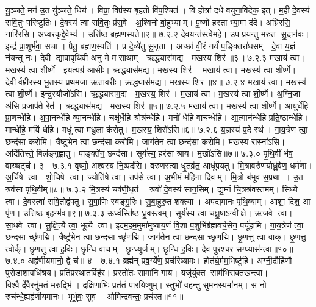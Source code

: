 यु॒ञ्जते॒ मन॑ उ॒त यु॑ञ्जते॒ धिय॑। विप्रा॒ विप्र॑स्य बृह॒तो वि॑प॒श्चित॑। वि होत्रा॑ दधे वयुना॒विदेक॒ इत्। म॒ही दे॒वस्य॑ सवि॒तुः परि॑ष्टुतिः। दे॒वस्य॑ त्वा सवि॒तुः प्र॑स॒वे। अ॒श्विनोर्बा॒हुभ्याम्। पू॒ष्णो हस्ताभ्या॒मा द॑दे। अभ्रि॑रसि॒ नारि॑रसि। अ॒ध्व॒र॒कृद्दे॒वेभ्य॑। उत्ति॑ष्ठ ब्रह्मणस्पते॥२॥
७.२.२
दे॒व॒यन्त॑स्त्वेमहे। उप॒ प्रय॑न्तु म॒रुत॑ सु॒दान॑वः। इन्द्र॑ प्रा॒शूर्भ॑वा॒ सचा। प्रैतु॒ ब्रह्म॑ण॒स्पति॑। प्र दे॒व्ये॑तु सू॒नृता। अच्छा॑ वी॒रं नर्यं॑ प॒ङ्क्तिरा॑धसम्। दे॒वा य॒ज्ञं न॑यन्तु नः। देवी द्यावापृथिवी॒ अनु॑ मे मसाथाम्। ऋ॒द्ध्यास॑म॒द्य। म॒खस्य॒ शिर॑॥३॥
७.२.३
म॒खाय॑ त्वा। म॒खस्य॑ त्वा शी॒र्ष्णे। इय॒त्यग्र॑ आसीः। ऋ॒द्ध्यास॑म॒द्य। म॒खस्य॒ शिर॑। म॒खाय॑ त्वा। म॒खस्य॑ त्वा शी॒र्ष्णे। देवीर्वम्रीर॒स्य भू॒तस्य॑ प्रथमजा ऋतावरीः। ऋ॒द्ध्यास॑म॒द्य। म॒खस्य॒ शिर॑॥४॥
७.२.४
म॒खाय॑ त्वा। म॒खस्य॑ त्वा शी॒र्ष्णे। इन्द्र॒स्यौजो॑ऽसि। ऋ॒द्ध्यास॑म॒द्य। म॒खस्य॒ शिर॑। म॒खाय॑ त्वा। म॒खस्य॑ त्वा शी॒र्ष्णे। अ॒ग्नि॒जा अ॑सि प्र॒जाप॑ते॒ रेत॑। ऋ॒द्ध्यास॑म॒द्य। म॒खस्य॒ शिर॑॥५॥
७.२.५
म॒खाय॑ त्वा। म॒खस्य॑ त्वा शी॒र्ष्णे। आयु॑र्धेहि प्रा॒णन्धे॑हि। अ॒पा॒नन्धे॑हि व्या॒नन्धे॑हि। चक्षु॑र्धेहि॒ श्रोत्र॑न्धेहि। मनो॑ धेहि॒ वाच॑न्धेहि। आ॒त्मान॑न्धेहि प्रति॒ष्ठान्धे॑हि। मान्धे॑हि॒ मयि॑ धेहि। मधु॑ त्वा मधु॒ला क॑रोतु। म॒खस्य॒ शिरो॑ऽसि॥६॥
७.२.६
य॒ज्ञस्य॑ प॒दे स्थ॑। गा॒य॒त्रेण॑ त्वा॒ छन्द॑सा करोमि। त्रैष्टु॑भेन त्वा॒ छन्द॑सा करोमि। जाग॑तेन त्वा॒ छन्द॑सा करोमि। म॒खस्य॒ रास्ना॑ऽसि। अदि॑तिस्ते॒ बिल॑ङ्गृह्णातु। पाङ्क्ते॑न॒ छन्द॑सा। सूर्य॑स्य॒ हर॑सा श्राय। म॒खो॑ऽसि॥७॥
७.३.०
पृ॒थि॒वीं भ॑व॒ वाख्षट्च॑। ३।
\anuvakamend
७.३.१
वृष्णो॒ अश्व॑स्य नि॒ष्पद॑सि। वरु॑णस्त्वा धृ॒तव्र॑त॒ आधू॑पयतु। मि॒त्रावरु॑णयोर्ध्रु॒वेण॒ धर्म॑णा। अ॒र्चिषे त्वा। शो॒चिषे त्वा। ज्योति॑षे त्वा। तप॑से त्वा। अ॒भीमं म॑हि॒ना दिवम्। मि॒त्रो ब॑भूव स॒प्रथा। उ॒त श्रव॑सा पृथि॒वीम्॥८॥
७.३.२
मि॒त्रस्य॑ चर्\mbox{}षणी॒धृत॑। श्रवो॑ दे॒वस्य॑ सान॒सिम्। द्यु॒म्नं चि॒त्रश्र॑वस्तमम्। सिध्यै त्वा। दे॒वस्त्वा॑ सवि॒तोद्व॑पतु। सु॒पा॒णिः स्व॑ङ्गु॒रिः। सु॒बा॒हुरु॒त शक्त्या। अप॑द्यमानः पृथि॒व्याम्। आशा॒ दिश॒ आ पृ॑ण। उत्ति॑ष्ठ बृ॒हन्भ॑व॥९॥
७.३.३
ऊ॒र्ध्वस्ति॑ष्ठ ध्रु॒वस्त्वम्। सूर्य॑स्य त्वा॒ चक्षु॒षाऽन्वीक्षे। ऋ॒जवे त्वा। सा॒धवे त्वा। सु॒क्षि॒त्यै त्वा॒ भूत्यै त्वा। इ॒दम॒हम॒मुमा॑मुष्याय॒णं  वि॒शा प॒शुभि॑र्ब्रह्मवर्च॒सेन॒ पर्यू॑हामि। गा॒य॒त्रेण॑ त्वा॒ छन्द॒सा च्छृ॑णद्मि। त्रैष्टु॑भेन त्वा॒ छन्द॒सा च्छृ॑णद्मि। जाग॑तेन त्वा॒ छन्द॒सा च्छृ॑णद्मि। छृ॒णत्तु॑ त्वा॒ वाक्। छृ॒णत्तु॒ त्वोर्क्। छृ॒णत्तु॑ त्वा ह॒विः। छृ॒न्धि वाचम्। छृ॒न्ध्यूर्जम्। छृ॒न्धि ह॒विः। देव॑ पुरश्चर स॒ग्घ्यास॑न्त्वा॥१०॥
७.४.०
अहृ॑णीयमानो॒ द्वे च॑॥ ४।
\anuvakamend
७.४.१
ब्रह्म॑न् प्रव॒र्ग्ये॑ण॒ प्रच॑रिष्यामः। होत॑र्घ॒र्मम॒भिष्टु॑हि। अग्नी॒द्रौहि॑णौ पुरो॒डाशा॒वधि॑श्रय। प्रति॑प्रस्थात॒र्विह॑र। प्रस्तो॑तः॒ सामा॑नि गाय। यजु॑र्\mbox{}युक्त॒ साम॑भि॒राक्त॑खन्त्वा। विश्वैर्दे॒वैरनु॑मतं म॒रुद्भि॑। दक्षि॑णाभिः॒ प्रत॑तं पारयि॒ष्णुम्। स्तुभो॑ वहन्तु सुमन॒स्यमा॑नम्। स नो॒ रुच॑न्धे॒ह्यहृ॑णीयमानः। भूर्भुवः॒ सुव॑। ओमिन्द्र॑वन्तः॒ प्रच॑रत॥११॥
